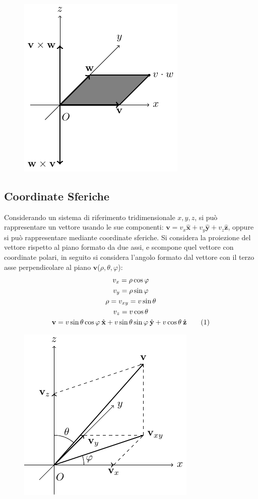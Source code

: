 \documentclass{article}
\newcommand{\vect}[1]{\boldsymbol{\mathbf{#1}}}
\numberwithin{equation}{subsection}
\begin{document}
\begin{figure}[H]%
    \centering
    \includegraphics{prodotto-vettoriale.pdf}%
\end{figure}

\subsection{Coordinate Sferiche}

Considerando un sistema di riferimento tridimensionale 
$x, y, z$, si può rappresentare un vettore usando le sue 
componenti: $\vect{v} = v_x\hat{\vect{x}} + v_y\hat{\vect{y}} + v_z\hat{\vect{z}}$,
oppure si può rappresentare mediante coordinate sferiche.
Si considera la proiezione del vettore rispetto al piano formato da due assi, e scompone quel vettore con coordinate polari, in seguito si considera l'angolo formato dal vettore con il terzo asse perpendicolare al piano $\vect{v}$($\rho, \theta, \varphi$):
\begin{gather*}
    v_x = \rho \cos\varphi\\
    v_y = \rho \sin\varphi\\
    \rho = v_{xy}  = v\sin\theta\\
    v_z = v\cos\theta\\
    \vect{v} = v\sin\theta \cos\varphi\:\hat{\vect{x}} + v\sin\theta \sin\varphi\:\hat{\vect{y}} + v\cos\theta\:\hat{\vect{z}}\tag{\stepcounter{equation}\theequation}
\end{gather*}
\begin{figure}[H]%
    \centering
    \includegraphics{coordinate-sferiche.pdf}%
\end{figure}
\end{document}
